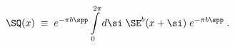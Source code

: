 \begin{equation}
\SQ(x)\;\equiv\;e^{-\pi b\spp}
\int\limits_0^{2\pi}d\si\;\SE^b(x+\si)\;e^{-\pi b\spp}\;.
\end{equation}

